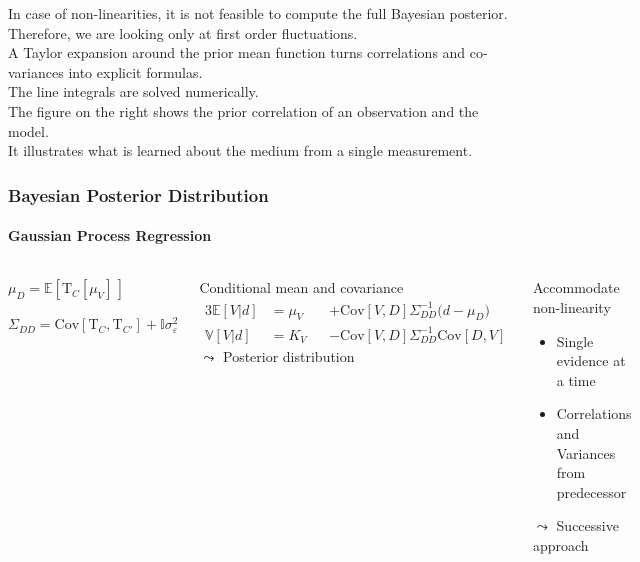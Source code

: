 \documentclass[aspectratio=169, t, 10pt,
    ]{beamer}
\newcommand\Mean[1]{\mathbb{E}\!\left[#1\right]}
\newcommand\Var[1]{\mathbb{V}\!\left[#1\right]}
\newcommand\Cov[2]{\mathrm{Cov}\!\left[#1,#2\right]}
\newcommand{\Identity}{\mathbb{I}}
\begin{document}
In case of non-linearities, it is not feasible to compute the full Bayesian posterior.
\\
Therefore, we are looking only at first order fluctuations.
\\
A Taylor expansion around the prior mean function turns correlations and co-variances into explicit formulas.
\\
The line integrals are solved numerically.
\\[2mm]

The figure on the right shows the prior correlation of an observation and the model.
\\
It illustrates what is learned about the medium from a single measurement.



\begin{frame}
    \frametitle{Bayesian Posterior Distribution}
    \framesubtitle{Gaussian Process Regression}

\begin{columns}

    \vspace{-1mm}
    \begin{description}[labelwidth=25mm]
        \item [Prior travel times] $\mu_D = \Mean{\mathrm T_C[\mu_V]\,}$
        \item [Covariance matrix]  $\Sigma_{DD} = \Cov{\mathrm T_C}{\mathrm T_{C'}} + \Identity \sigma_\varepsilon^2$
    \end{description}
    \vspace{-1mm}

    \begin{exampleblock}{Conditional mean and covariance}
        \setlength\abovedisplayskip{0pt}
        \begin{alignat}{3}
            \Mean{V|d} &= \mu_V &&+ \Cov VD \Sigma_{DD}^{-1} \big( d - \mu_{D} \big)
            \\
            \Var{V|d}  &= K_V   &&- \Cov VD \Sigma_{DD}^{-1} \Cov DV
        \end{alignat}
        \hfill $\leadsto$ Posterior distribution ~
    \end{exampleblock}

    \begin{alertblock}{Accommodate non-linearity}
        \begin{itemize}
            \item Single evidence at a time
            \item Correlations and Variances from predecessor
        \end{itemize}
        \hfill  $\leadsto$ Successive approach ~
    \end{alertblock}


\end{columns}
\end{frame}
\end{document}
